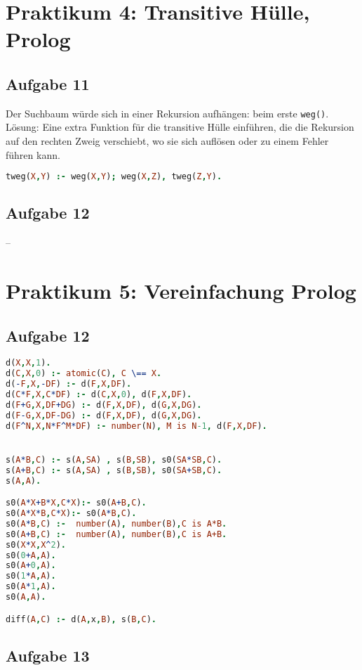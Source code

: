 \documentclass{scrreprt}
\begin{document}
\chapter{Praktikum 4: Transitive Hülle, Prolog}

\section{Aufgabe 11}
Der Suchbaum würde sich in einer Rekursion aufhängen: beim erste \lstinline$weg()$.\\
Lösung: Eine extra Funktion für die transitive Hülle einführen, die die Rekursion auf den rechten Zweig verschiebt, wo sie sich auflösen oder zu einem Fehler führen kann.
\begin{lstlisting}[language=Prolog]
tweg(X,Y) :- weg(X,Y); weg(X,Z), tweg(Z,Y).
\end{lstlisting}

\section{Aufgabe 12}
--

\chapter{Praktikum 5: Vereinfachung Prolog}

\section{Aufgabe 12}
\begin{lstlisting}[language=Prolog]
d(X,X,1).
d(C,X,0) :- atomic(C), C \== X.
d(-F,X,-DF) :- d(F,X,DF).
d(C*F,X,C*DF) :- d(C,X,0), d(F,X,DF).
d(F+G,X,DF+DG) :- d(F,X,DF), d(G,X,DG).
d(F-G,X,DF-DG) :- d(F,X,DF), d(G,X,DG).
d(F^N,X,N*F^M*DF) :- number(N), M is N-1, d(F,X,DF).


s(A*B,C) :- s(A,SA) , s(B,SB), s0(SA*SB,C).
s(A+B,C) :- s(A,SA) , s(B,SB), s0(SA+SB,C).
s(A,A).

s0(A*X+B*X,C*X):- s0(A+B,C).
s0(A*X*B,C*X):- s0(A*B,C).
s0(A*B,C) :-  number(A), number(B),C is A*B.
s0(A+B,C) :-  number(A), number(B),C is A+B.
s0(X*X,X^2).
s0(0+A,A).
s0(A+0,A).
s0(1*A,A).
s0(A*1,A).
s0(A,A).

diff(A,C) :- d(A,x,B), s(B,C).
\end{lstlisting}

\section{Aufgabe 13}

\end{document}
